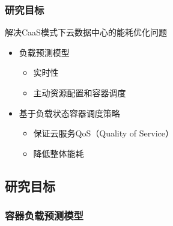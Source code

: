 
\begin{frame}
\frametitle{研究目标}
\begin{block}{解决CaaS模式下云数据中心的能耗优化问题}
    \begin{itemize}
        \item 负载预测模型
        \begin{itemize}
            \item 实时性
            \item 主动资源配置和容器调度
        \end{itemize}
        \item 基于负载状态容器调度策略
        \begin{itemize}
            \item 保证云服务QoS（Quality of Service）
            \item 降低整体能耗
        \end{itemize}
    \end{itemize}
\end{block}
\end{frame}

\subsection{研究目标}

\subsubsection{容器负载预测模型}

